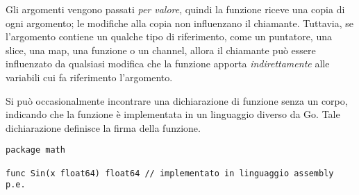 \documentclass[../../thesis.tex]{subfiles}
\begin{document}
    Gli argomenti vengono passati \textit{per valore}, quindi la funzione riceve una copia di ogni argomento;
    le modifiche alla copia non influenzano il chiamante.
    Tuttavia, se l'argomento contiene un qualche tipo di riferimento, come un puntatore, una slice, una map, una funzione o un channel, allora il chiamante può essere influenzato da qualsiasi modifica che la funzione apporta \textit{indirettamente} alle variabili cui fa riferimento l'argomento.
    \hfill \vspace{12pt}

    Si può occasionalmente incontrare una dichiarazione di funzione senza un corpo, indicando che la funzione è implementata in un linguaggio diverso da Go. Tale dichiarazione definisce la firma della funzione.
    \begin{lstlisting}[frame = single,label={lst:lstlisting4-1.4}]
package math

func Sin(x float64) float64 // implementato in linguaggio assembly p.e.
    \end{lstlisting}
\end{document}

